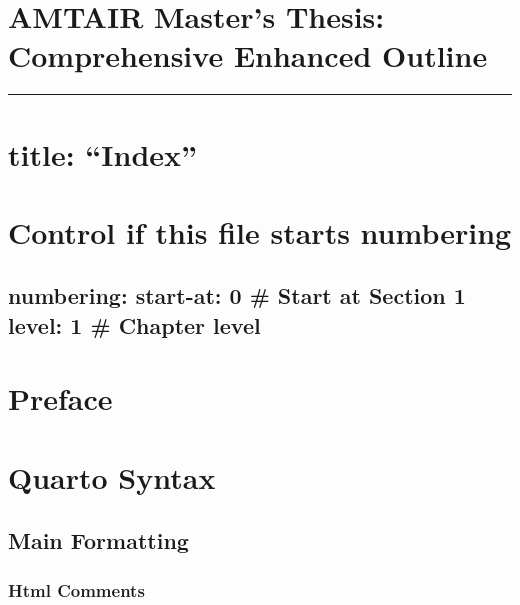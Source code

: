 \documentclass[
  11pt,
  letterpaper,
]{book}
\begin{document}

\chapter{AMTAIR Master's Thesis: Comprehensive Enhanced
Outline}\label{amtair-masters-thesis-comprehensive-enhanced-outline}

\begin{center}\rule{0.5\linewidth}{0.5pt}\end{center}


\chapter{title: ``Index''}\label{title-index}


\chapter{Control if this file starts
numbering}\label{control-if-this-file-starts-numbering}

\section{numbering: start-at: 0 \# Start at Section 1 level: 1 \#
Chapter
level}\label{numbering-start-at-0-start-at-section-1-level-1-chapter-level}


\chapter*{Preface}\label{preface-1}



\chapter{Quarto Syntax}\label{sec-syntax}

\section{Main Formatting}\label{main-formatting-1}

\subsection{Html Comments}\label{html-comments-1}
\end{document}
